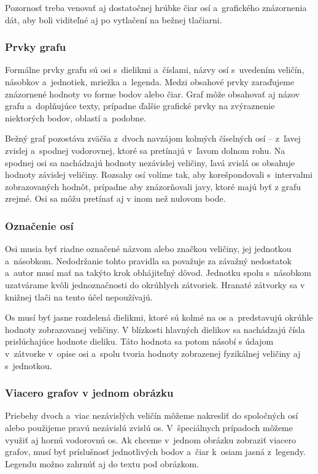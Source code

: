 Pozornosť treba venovať aj dostatočnej hrúbke čiar osí
a~grafického znázornenia dát,
aby boli viditeľné aj po vytlačení na bežnej tlačiarni.

\subsubsection{Prvky grafu}
Formálne prvky grafu sú osi s~dielikmi a~číslami,
názvy osí s~uvedením veličín, násobkov a~jednotiek,
mriežka a~legenda.
Medzi obsahové prvky zaraďujeme znázornené hodnoty vo forme
bodov alebo čiar.
Graf môže obsahovať aj názov grafu
a~doplňujúce texty,
prípadne ďalšie grafické prvky na zvýraznenie niektorých bodov,
oblastí a~podobne.

Bežný graf pozostáva zväčša z~dvoch navzájom kolmých číselných
osí – z~ľavej zvislej a~spodnej vodorovnej,
ktoré sa pretínajú v~ľavom dolnom rohu.
Na spodnej osi sa nachádzajú hodnoty nezávislej veličiny,
ľavá zvislá os obsahuje hodnoty závislej veličiny.
Rozsahy osí volíme tak,
aby korešpondovali s~intervalmi zobrazovaných hodnôt,
prípadne aby znázorňovali javy,
ktoré majú byť z grafu zrejmé.
Osi sa môžu pretínať aj v inom než nulovom bode.

\subsubsection{Označenie osí}
Osi musia byť riadne označené názvom alebo značkou veličiny,
jej jednotkou a~násobkom.
Nedodržanie tohto pravidla sa považuje za závažný nedostatok
a~autor musí mať na takýto krok obhájiteľný dôvod.
Jednotku spolu s~násobkom uzatvárame kvôli jednoznačnosti
do okrúhlych zátvoriek.
Hranaté zátvorky sa v knižnej tlači na tento účel nepoužívajú.

Os musí byť jasne rozdelená dielikmi,
ktoré sú kolmé na os a~predstavujú okrúhle hodnoty
zobrazovanej veličiny.
V blízkosti hlavných dielikov sa nachádzajú čísla prislúchajúce
hodnote dieliku.
Táto hodnota sa potom násobí s údajom v~zátvorke
v~opise osi a~spolu tvoria hodnoty zobrazenej fyzikálnej
veličiny aj s~jednotkou.

\subsubsection{Viacero grafov v jednom obrázku}
Priebehy dvoch a~viac nezávislých veličín môžeme nakresliť
do spoločných osí alebo použijeme pravú nezávislú zvislú os.
V~špeciálnych prípadoch môžeme využiť aj hornú vodorovnú os.
Ak chceme v~jednom obrázku zobraziť viacero grafov,
musí byť príslušnosť jednotlivých bodov a~čiar k~osiam jasná
z~legendy.
Legendu možno zahrnúť aj do textu pod obrázkom.

